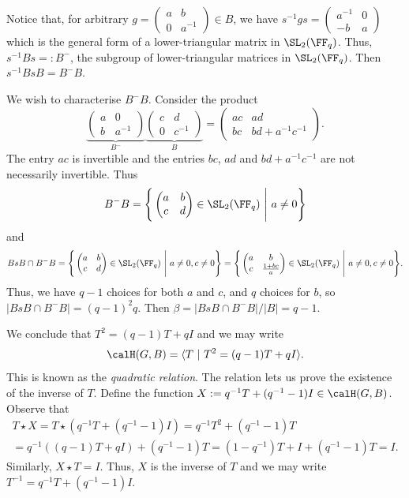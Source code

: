\documentclass[11pt]{amsart}
\theoremstyle{remark}
\begin{document}
Notice that, for arbitrary $g = \left(\begin{smallmatrix} a & b \\ 0 & a^{-1}\end{smallmatrix}\right)\in B$, we have $s^{-1}gs = \left(\begin{smallmatrix} a^{-1} & 0 \\ -b & a \end{smallmatrix}\right)$ which is the general form of a lower-triangular matrix in $\SL_2(\FF_q)$.
Thus, $s^{-1}Bs =: B^-$, the subgroup of lower-triangular matrices in $\SL_2(\FF_q)$.
Then $s^{-1}BsB = B^-B$.

We wish to characterise $B^-B$.
Consider the product
\[
	\underbrace{\begin{pmatrix}
			a & 0      \\
			b & a^{-1}
		\end{pmatrix}}_{B^-}
	\underbrace{\begin{pmatrix}
			c & d      \\
			0 & c^{-1}
		\end{pmatrix}}_{B} =
	\begin{pmatrix}
		ac & ad                \\
		bc & bd + a^{-1}c^{-1}
	\end{pmatrix}.
\]
The entry $ac$ is invertible and the entries $bc$, $ad$ and $bd + a^{-1}c^{-1}$ are not necessarily invertible.
Thus
\[
	B^-B = \Bigg\{\begin{pmatrix} a & b \\ c & d\end{pmatrix}\in \SL_2(\FF_q)\ \Bigg|\ a\neq 0\Bigg\}
\]
and
\[
	BsB\cap B^-B = \Bigg\{\begin{pmatrix} a & b \\ c & d\end{pmatrix}\in \SL_2(\FF_q)\ \Bigg|\ a\neq 0, c\neq 0\Bigg\} = \Bigg\{\begin{pmatrix} a & b \\ c & \frac{1+bc}{a}\end{pmatrix}\in \SL_2(\FF_q)\ \Bigg|\ a\neq 0, c\neq 0\Bigg\}.
\]
Thus, we have $q-1$ choices for both $a$ and $c$, and $q$ choices for $b$, so $|BsB\cap B^-B| = (q-1)^2q$.
Then $\beta = |BsB\cap B^-B|/|B| = q-1$.

We conclude that $T^2 = (q-1)T + qI$ and we may write
\[
	\calH(G,B) = \langle T\ |\ T^2 = (q-1)T + qI\rangle.
\]
This is known as the \emph{quadratic relation}.
The relation lets us prove the existence of the inverse of $T$.
Define the function $X := q^{-1}T + (q^{-1}-1)I \in \calH(G,B)$.
Observe that
\begin{multline*}
	T\star X = T\star (q^{-1}T + (q^{-1}-1)I) = q^{-1}T^2 + (q^{-1}-1)T \\
	= q^{-1}((q-1)T+qI) + (q^{-1}-1)T = (1-q^{-1})T+I + (q^{-1}-1)T = I.
\end{multline*}
Similarly, $X\star T = I$.
Thus, $X$ is the inverse of $T$ and we may write $T^{-1} = q^{-1}T + (q^{-1}-1)I$.
\end{document}
